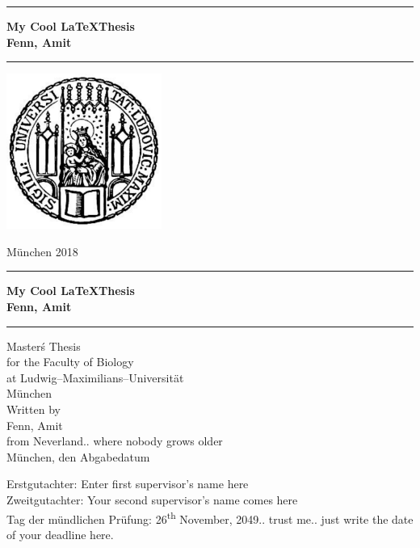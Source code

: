 \documentclass[12pt]{book}
\newcommand{\LMUTitle}[9]{
  \thispagestyle{empty}
  \vspace*{\stretch{1}}
  {\parindent0cm
   \rule{\linewidth}{.7ex}}
  \begin{flushright}

    \vspace*{\stretch{1}}
    \rmfamily\bfseries\Huge
    #1\\
    \vspace*{\stretch{1}}
    \rmfamily\bfseries\large
    #2
    \vspace*{\stretch{1}}
  \end{flushright}
  \rule{\linewidth}{.7ex}
  \vspace*{\stretch{5}}
  \begin{center}
    \includegraphics[width=2in]{siegel}
  \end{center}
  \vspace*{\stretch{1}}
  \begin{center}\sffamily\LARGE{#5}\end{center}
  \newpage
  \thispagestyle{empty}

  \cleardoublepage
  \thispagestyle{empty}

  \vspace*{\stretch{1}}
  {\parindent0cm
  \rule{\linewidth}{.7ex}}
  \begin{flushright}
    \vspace*{\stretch{1}}
    \sffamily\bfseries\Huge
    #1\\
    \vspace*{\stretch{1}}
    \sffamily\bfseries\large
    #2
    \vspace*{\stretch{1}}
  \end{flushright}
  \rule{\linewidth}{.7ex}

  \vspace*{\stretch{3}}
  \begin{center}
    \Large Master\'s Thesis\\
    \Large for the #4\\
    \Large at Ludwig--Maximilians--Universit\"at\\
    \Large M\"unchen\\
    \vspace*{\stretch{1}}
    \Large Written by\\
    \Large #2\\
    \Large from #3\\
    \vspace*{\stretch{2}}
    \Large M\"unchen, den #6
  \end{center}

  \newpage
  \thispagestyle{empty}

  \vspace*{\stretch{1}}

  \begin{flushleft}
    \large Erstgutachter:  #7 \\[1mm]
    \large Zweitgutachter: #8 \\[1mm]
    \large Tag der m\"undlichen Pr\"ufung: #9\\
  \end{flushleft}

  \cleardoublepage
}
\begin{document}
  \frontmatter


  \LMUTitle
      {My Cool \LaTeX Thesis}               %
      {Fenn, Amit}                       %
      {Neverland.. where nobody grows older}                             %
      {Faculty of Biology}                         %
      {M\"unchen 2018}                          %
      {Abgabedatum}                            %
      {Enter first supervisor's name here}                          %
      {Your second supervisor's name comes here}                         %
      {26\textsuperscript{th} November, 2049.. trust me.. just write the date of your deadline here.}                         %


  \tableofcontents



  

  \mainmatter\setcounter{page}{1}

  
  
  
  




  \backmatter
  
  \markboth{}{}
\end{document}
